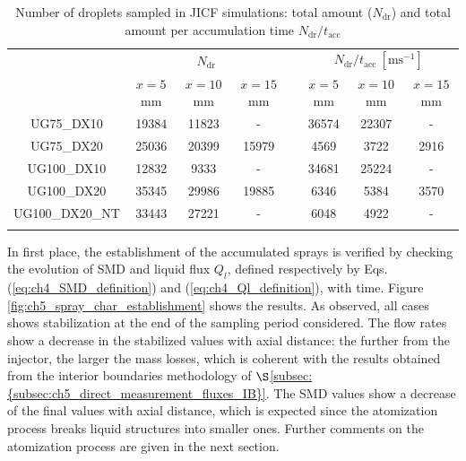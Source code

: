 \begin{table}[!h]
\centering
\caption{Number of droplets sampled in JICF simulations: total amount ($N_\mathrm{dr}$) and total amount per accumulation time $N_\mathrm{dr}/t_\mathrm{acc}$}
\begin{tabular}{cccccccc}
\thickhline
\multirow{2}{*}{ \textbf{Case}}  & \multicolumn{3}{c}{$N_\mathrm{dr}$} & & \multicolumn{3}{c}{$N_\mathrm{dr}/t_\mathrm{acc}~[\mathrm{ms}^{-1}]$} \\
\cline{2-4} \cline{6-8}
& $x = 5$ mm & $x = 10$ mm & $x = 15$ mm &  & $x = 5$ mm & $x = 10$ mm & $x = 15$ mm  \\
\thickhline 
UG75\_DX10  & 19384 & 11823 & -  & & 36574 & 22307 & - \\
UG75\_DX20  & 25036 & 20399 & 15979  & & 4569 & 3722 & 2916 \\
UG100\_DX10 & 12832 & 9333 & -  & & 34681 & 25224 & - \\
UG100\_DX20 & 35345 & 29986 & 19885  & & 6346 & 5384 & 3570 \\
UG100\_DX20\_NT & 33443 & 27221 & -  & & 6048 & 4922 & - \\
\thickhline
\end{tabular}
\label{tab:jicf_SLI_Ndr_accumulated}
\end{table}












In first place, the establishment of the accumulated sprays is verified by checking the evolution of SMD and liquid flux $Q_l$, defined respectively by Eqs. (\ref{eq:ch4_SMD_definition}) and (\ref{eq:ch4_Ql_definition}), with time. Figure \ref{fig:ch5_spray_char_establishment} shows the results. As observed, all cases shows stabilization at the end of the sampling period considered. The flow rates show a decrease in the stabilized values with axial distance: the further from the injector, the larger the mass losses, which is coherent with the results obtained from the interior boundaries methodology of $\S$\ref{subsec:{subsec:ch5_direct_measurement_fluxes_IB}}. The SMD values show a decrease of the final values with axial distance, which is expected since the atomization process breaks liquid structures into smaller ones. Further comments on the atomization process are given in the next section. %

